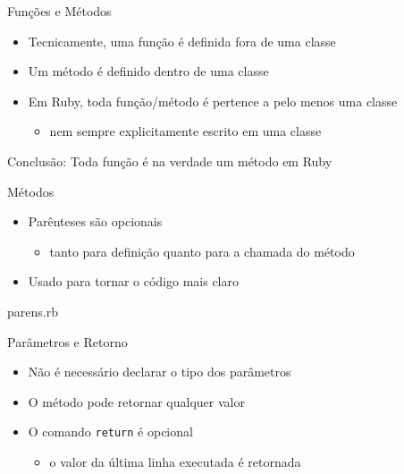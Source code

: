 
\begin{frame}[fragile,t]{Funções e Métodos}
  \begin{itemize}
    \item Tecnicamente, uma \alert{função} é definida \alert{fora} de uma classe
    \item Um \alert{método} é definido dentro de uma classe
    \item Em Ruby, \alert{toda} função/método é pertence a pelo menos uma classe
    \begin{itemize}
      \item nem sempre explicitamente escrito em uma classe
    \end{itemize}
  \end{itemize}
  \framebreak   
  \begin{center}
    Conclusão: Toda \alert{função} é na verdade um \alert{método} em Ruby  
  \end{center}
\end{frame}

\begin{frame}[fragile,t]{Métodos}
  \begin{itemize}
    \item Parênteses são \alert{opcionais}
    \begin{itemize}
      \item tanto para definição quanto para a chamada do método
    \end{itemize}
    \item Usado para tornar o código mais claro
  \end{itemize}
  \begin{block}{parens.rb}
  	
  \end{block}
  
    
\end{frame}

\begin{frame}[fragile,t]{Parâmetros e Retorno}
  \begin{itemize}
    \item Não é necessário declarar o tipo dos parâmetros
    \item O método pode retornar qualquer valor
    \item O comando \verb!return! é opcional
    \begin{itemize}
      \item o valor da \alert{última linha} executada é retornada 
    \end{itemize}
  \end{itemize}
  
  
    
\end{frame}

